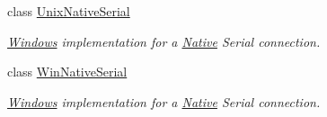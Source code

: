 \begin{DoxyCompactItemize}
class \mbox{\hyperlink{class_r_j_c_p_1_1_i_o_1_1_ports_1_1_native_1_1_unix_native_serial}{Unix\+Native\+Serial}}
\begin{DoxyCompactList}\small\item\em \mbox{\hyperlink{namespace_r_j_c_p_1_1_i_o_1_1_ports_1_1_native_1_1_windows}{Windows}} implementation for a \mbox{\hyperlink{namespace_r_j_c_p_1_1_i_o_1_1_ports_1_1_native}{Native}} Serial connection. \end{DoxyCompactList}\item 
class \mbox{\hyperlink{class_r_j_c_p_1_1_i_o_1_1_ports_1_1_native_1_1_win_native_serial}{Win\+Native\+Serial}}
\begin{DoxyCompactList}\small\item\em \mbox{\hyperlink{namespace_r_j_c_p_1_1_i_o_1_1_ports_1_1_native_1_1_windows}{Windows}} implementation for a \mbox{\hyperlink{namespace_r_j_c_p_1_1_i_o_1_1_ports_1_1_native}{Native}} Serial connection. \end{DoxyCompactList}\end{DoxyCompactItemize}
